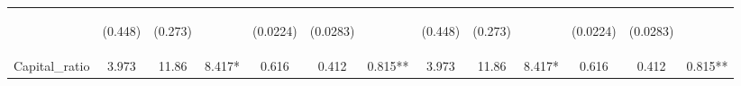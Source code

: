 \documentclass[]{article}
\begin{document}
\begin{center}
\begin{tabular}{lcccccccccccc}
\vspace{4pt} & \begin{footnotesize}(0.448)\end{footnotesize} & \begin{footnotesize}(0.273)\end{footnotesize} & \begin{footnotesize}\end{footnotesize} & \begin{footnotesize}(0.0224)\end{footnotesize} & \begin{footnotesize}(0.0283)\end{footnotesize} & \begin{footnotesize}\end{footnotesize} & \begin{footnotesize}(0.448)\end{footnotesize} & \begin{footnotesize}(0.273)\end{footnotesize} & \begin{footnotesize}\end{footnotesize} & \begin{footnotesize}(0.0224)\end{footnotesize} & \begin{footnotesize}(0.0283)\end{footnotesize} & \begin{footnotesize}\end{footnotesize} \\
Capital\_ratio & 3.973 & 11.86 & 8.417* & 0.616 & 0.412 & 0.815** & 3.973 & 11.86 & 8.417* & 0.616 & 0.412 & 0.815** \\

\end{tabular}
\end{center}
\end{document}
